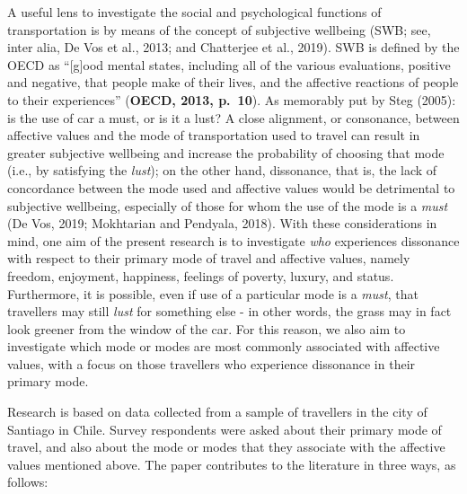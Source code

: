 \documentclass[]{elsarticle} %
\begin{document}
A useful lens to investigate the social and psychological functions of
transportation is by means of the concept of subjective wellbeing (SWB;
see, inter alia, De Vos et al., 2013; and Chatterjee et al., 2019). SWB
is defined by the OECD as ``{[}g{]}ood mental states, including all of
the various evaluations, positive and negative, that people make of
their lives, and the affective reactions of people to their
experiences'' (\textbf{OECD, 2013, p.~10}). As memorably put by Steg
(2005): is the use of car a must, or is it a lust? A close alignment, or
consonance, between affective values and the mode of transportation used
to travel can result in greater subjective wellbeing and increase the
probability of choosing that mode (i.e., by satisfying the \emph{lust});
on the other hand, dissonance, that is, the lack of concordance between
the mode used and affective values would be detrimental to subjective
wellbeing, especially of those for whom the use of the mode is a
\emph{must} (De Vos, 2019; Mokhtarian and Pendyala, 2018). With these
considerations in mind, one aim of the present research is to
investigate \emph{who} experiences dissonance with respect to their
primary mode of travel and affective values, namely freedom, enjoyment,
happiness, feelings of poverty, luxury, and status. Furthermore, it is
possible, even if use of a particular mode is a \emph{must}, that
travellers may still \emph{lust} for something else - in other words,
the grass may in fact look greener from the window of the car. For this
reason, we also aim to investigate which mode or modes are most commonly
associated with affective values, with a focus on those travellers who
experience dissonance in their primary mode.

Research is based on data collected from a sample of travellers in the
city of Santiago in Chile. Survey respondents were asked about their
primary mode of travel, and also about the mode or modes that they
associate with the affective values mentioned above. The paper
contributes to the literature in three ways, as follows:
\end{document}
